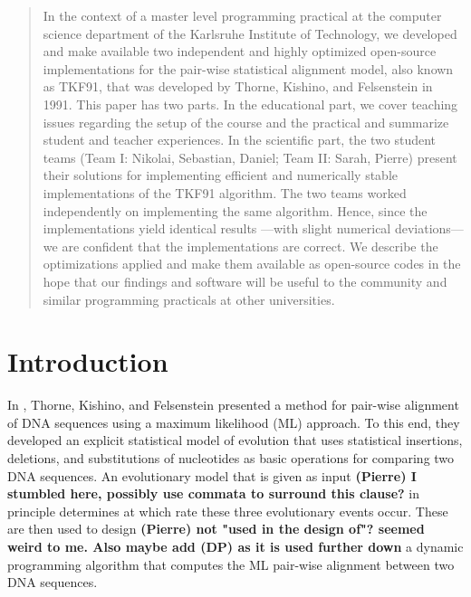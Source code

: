 \documentclass[runningheads,a4paper]{llncs}
\newcommand{\keywords}[1]{\par\addvspace\baselineskip
\noindent\keywordname\enspace\ignorespaces#1}
\begin{document}
\begin{abstract}
In the context of a master level programming practical at the computer science department of the Karlsruhe Institute of Technology, 
we developed and make available two independent and highly optimized open-source implementations for the pair-wise 
statistical alignment model, also known as TKF91, that was developed by Thorne, Kishino, and Felsenstein in 1991. 
This paper has two parts. 
In the educational part, we cover teaching issues regarding the setup of the course and the practical and summarize student and teacher experiences. 
In the scientific part, the two student teams (Team I: Nikolai, Sebastian, Daniel; Team II: Sarah, Pierre) present their
solutions for implementing efficient and numerically stable implementations of the TKF91 algorithm. 
The two teams worked independently on implementing the same algorithm. Hence, since the implementations yield identical results ---with slight numerical deviations--- 
we are confident that the implementations are correct. We describe the optimizations applied and make them available as open-source codes 
in the hope that our findings and software will be useful to the community and similar programming practicals at other universities.


\end{abstract}


\section{Introduction}
\label{sec:introduction}

In \cite{TKF91}, Thorne, Kishino, and Felsenstein presented a method for pair-wise alignment of DNA sequences using a maximum likelihood (ML) approach.
To this end, they developed an explicit statistical model of evolution that uses statistical insertions, deletions, and substitutions of nucleotides 
as basic operations for comparing two DNA sequences. 
An evolutionary model that is given as input \textbf{(Pierre) I stumbled here, possibly use commata to surround this clause?} in principle determines at which rate these three evolutionary events occur.  
These are then used to design \textbf{(Pierre) not "used in the design of"? seemed weird to me. Also maybe add (DP) as it is used further down} a dynamic programming algorithm that computes the ML pair-wise alignment between two DNA sequences. 
\end{document}
